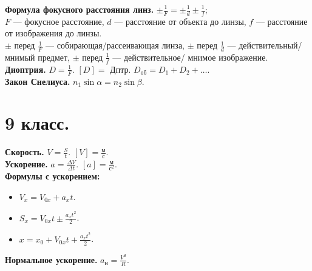 \documentclass[12pt]{article}
\begin{document}
	\textbf{Формула фокусного расстояния линз.} $\pm \frac{1}{F} = \pm \frac{1}{d} \pm \frac{1}{f}$; \\
	$F$ --- фокусное расстояние, $d$ --- расстояние от объекта до линзы, $f$ --- расстояние от изображения до линзы. \\
	$\pm$ перед $\frac{1}{F}$ --- собирающая/рассеивающая линза, $\pm$ перед $\frac{1}{d}$ --- действительный/мнимый предмет, $\pm$ перед $\frac{1}{f}$ --- действительное/ мнимое изображение. \\
	\textbf{Диоптрия.} $D = \frac{1}{F}$. $[D] =$ Дптр. $D_{\text{об}} = D_1 + D_2 + \dots$. \\
	\textbf{Закон Снелиуса.} $n_1 \sin\alpha = n_2 \sin\beta$.
	
	
	
	
	
	\section{9 класс.}
	\textbf{Скорость.} $V = \frac{S}{t}$. $[V] = \frac{\text{м}}{\text{с}}$. \\
	\textbf{Ускорение.} $a = \frac{\varDelta V}{\varDelta t}$. $[a] = \frac{\text{м}}{\text{с}^2}$. \\
	\textbf{Формулы с ускорением:}
	\begin{itemize}
		\item $V_x = V_{0x} + a_xt$.
		\item $S_x = V_{0x}t \pm \frac{a_xt^2}{2}$.
		\item $x = x_0 + V_{0x}t + \frac{a_xt^2}{2}$.
	\end{itemize}
	\textbf{Нормальное ускорение.} $a_{\text{н}} = \frac{V^2}{R}$. \\
\end{document}
